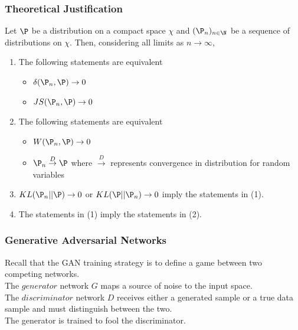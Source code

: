 \documentclass{beamer}
\begin{document}
\begin{frame}
\frametitle{Theoretical Justification}



\begin{Theorem}[2]
Let $\P$ be a distribution on a compact space $\chi$ and $(\P_{n})_{n \in \N}$ be a sequence of distributions on $\chi$. Then, considering all limits as $n \to \infty$,
\begin{enumerate}
\item{The following statements are equivalent
\begin{itemize}
\item{$\delta(\P_{n}, \P) \to 0$}
\item{$JS(\P_{n}, \P) \to 0$}
\end{itemize}
}
\item{The following statements are equivalent
\begin{itemize}
\item{$W(\P_{n}, \P) \to 0$}
\item{$\P_{n} \overset{D}{\to} \P$ where $\overset{D}{\to}$ represents convergence in distribution for random variables}
\end{itemize}
}
\item{$KL(\P_{n}||\P) \to 0$ or $KL(\P||\P_{n}) \to 0$ imply the statements in (1).}
\item{The statements in (1) imply the statements in (2).}
\end{enumerate}
\end{Theorem}
\end{frame}


\begin{frame}
\frametitle{Generative Adversarial Networks}

Recall that the GAN training strategy is to define a game between two competing networks.\\
\vspace{15pt}
\pause
The $generator$ network $G$ maps a source of noise to the input space. \\
\vspace{15pt}
\pause
The $discriminator$ network $D$ receives either a generated sample or a true data sample and must distinguish between the two.\\
\vspace{15pt}
\pause
The generator is trained to fool the discriminator.\\
\vspace{15pt}
\end{frame}
\end{document}
